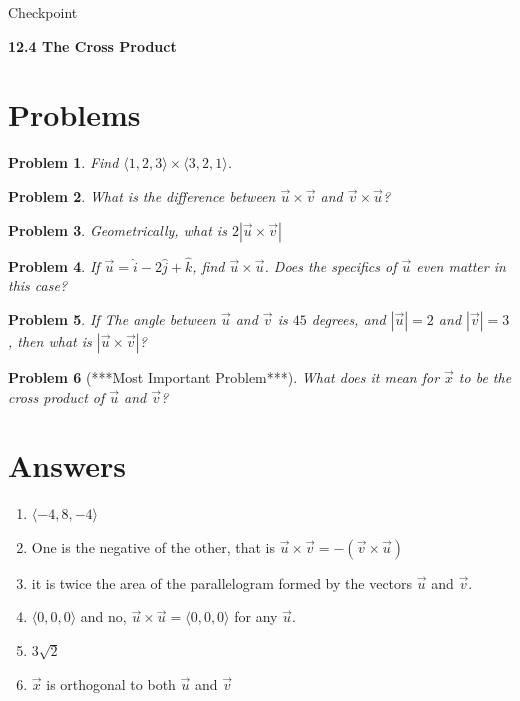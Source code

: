 \documentclass[11pt]{article}
\newtheorem{problem}{Problem}
\newcommand{\vs}{\vspace*{.1in}}
\begin{document}
\begin{huge}
    \begin{center}
        Checkpoint
    \end{center}
\end{huge}
\begin{large}\begin{center}\bf 12.4 The Cross Product\end{center}
\end{large}

\vs\vs

\section{Problems}

\begin{problem}
 Find $\langle 1,2,3\rangle \times \langle 3,2,1 \rangle$.   
\end{problem}

\begin{problem}
    What is the difference between $\Vec{u}\times \vec{v}$ and $\vec{v} \times \vec{u}$?
\end{problem}

\begin{problem}
    Geometrically, what is $2|\vec{u} \times \vec{v}|$
\end{problem}

\begin{problem}
If $\vec{u}= \hat{i}-2\hat{j}+\hat{k}$, find $\vec{u}\times \vec{u}$. Does the specifics of $\vec{u}$ even matter in this case?
\end{problem}

\begin{problem}
    If The angle between $\vec{u}$ and $\vec{v}$ is $45$ degrees, and $|\vec{u}|=2$ and $|\vec{v}|=3$, then what is $|\vec{u} \times \vec{v}|$?
\end{problem}

\begin{problem} [***Most Important Problem***] What does it mean for $\vec{x}$ to be the cross product of $\vec{u}$ and $\vec{v}$?
\end{problem}

\newpage

\section{Answers}

\begin{enumerate}
    \item $\langle -4,8,-4\rangle$
    \item One is the negative of the other, that is $\Vec{u}\times \vec{v} = -(\vec{v} \times \vec{u})$
    \item it is twice the area of the parallelogram formed by the vectors $\vec{u}$ and $\vec{v}$.
    \item $\langle 0,0,0 \rangle $ and no, $\vec{u}\times \vec{u}  = \langle 0,0,0\rangle $ for any $\vec{u}$.
    \item $3\sqrt{2}$
    \item $\vec{x}$ is orthogonal to both $\vec{u}$ and $\vec{v}$
\end{enumerate}
\end{document}
